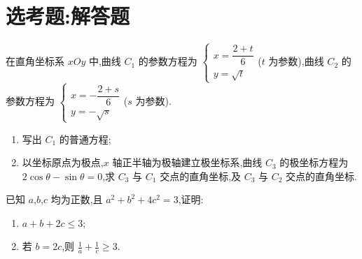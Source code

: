 \section{选考题:解答题}

\begin{problem}
在直角坐标系 \(xOy\) 中,曲线 \(C_1\) 的参数方程为 \(\begin{cases}
x=\dfrac{2+t}{6}\\
y=\sqrt t
\end{cases}\)(\(t\) 为参数),曲线 \(C_2\) 的参数方程为 \(\begin{cases}
x=-\dfrac{2+s}{6}\\
y=-\sqrt s
\end{cases}\)(\(s\) 为参数).

\begin{enumerate}
\item 写出 \(C_1\) 的普通方程;
\item 以坐标原点为极点,\(x\) 轴正半轴为极轴建立极坐标系,曲线 \(C_3\) 的极坐标方程为 \(2\cos\theta-\sin\theta=0\),求 \(C_3\) 与 \(C_1\) 交点的直角坐标,及 \(C_3\) 与 \(C_2\) 交点的直角坐标.
\end{enumerate}
\end{problem}

\begin{problem}
已知 \(a\),\(b\),\(c\) 均为正数,且 \(a^2+b^2+4c^2=3\),证明:

\begin{enumerate}
\item \(a+b+2c\le 3\);
\item 若 \(b=2c\),则 \(\frac1a+\frac1c\ge 3\).
\end{enumerate}
\end{problem}

